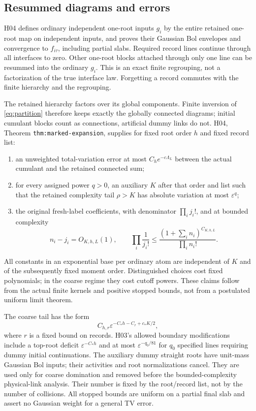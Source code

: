 \documentclass[11pt]{article}
\newcommand{\eps}{\varepsilon}
\theoremstyle{definition}\newtheorem{definition}[theorem]{Definition}
\theoremstyle{remark}\newtheorem{remark}[theorem]{Remark}
\numberwithin{equation}{section}
\begin{document}
\subsection{Resummed diagrams and errors}\label{subsec:expansion}
H04 defines ordinary independent one-root inputs $g_i$ by the entire retained
one-root map on independent inputs, and proves their Gaussian Bol envelopes
and convergence to $f_{i\tau}$, including partial slabs. Required record
lines continue through all interfaces to zero. Other one-root blocks
attached through only one line can be resummed into the ordinary $g_i$.
This is an exact finite regrouping, not a factorization of the true interface
law. Forgetting a record commutes with the finite hierarchy and the
regrouping.

The retained hierarchy factors over its global components. Finite inversion
of \eqref{eq:partition} therefore keeps exactly the globally connected
diagrams; initial cumulant blocks count as connections, artificial dummy
links do not. H04, Theorem \texttt{thm:marked-expansion}, supplies for fixed
root order $h$ and fixed record list:
\begin{enumerate}
\item an unweighted total-variation error at most $C_h e^{-c\Lambda_L}$
 between the actual cumulant and the retained connected sum;
\item for every assigned power $q>0$, an auxiliary $K$ after that order and
 list such that the retained complexity tail $\rho>K$ has absolute variation
 at most $\eps^q$;
\item the original fresh-label coefficients, with denominator
 $\prod_i j_i!$, and at bounded complexity
 \begin{equation}\label{eq:factorials}
 n_i-j_i=O_{K,h,L}(1),\qquad
 \prod_i\frac1{j_i!}\le
     \frac{(1+\sum_i n_i)^{C_{K,h,L}}}{\prod_i n_i!}.
 \end{equation}
\end{enumerate}
All constants in an exponential base per ordinary atom are independent of
$K$ and of the subsequently fixed moment order. Distinguished choices cost
fixed polynomials; in the coarse regime they cost cutoff powers. These
claims follow from the actual finite kernels and positive stopped bounds,
not from a postulated uniform limit theorem.

The coarse tail has the form
\begin{equation}\label{eq:coarse}
 C_{h,r}\eps^{-C_*h-C_r+c_*K/2},
\end{equation}
where $r$ is a fixed bound on records. H03's allowed boundary modifications
include a top-root deficit $\eps^{-C_*h}$ and at most
$\eps^{-q_0/81}$ for $q_0$ specified lines requiring dummy initial
continuations. The auxiliary dummy straight roots have unit-mass Gaussian
Bol inputs; their activities and root normalizations cancel. They are used
only for coarse domination and removed before the bounded-complexity
physical-link analysis. Their number is fixed by the root/record list,
not by the number of collisions. All stopped bounds are uniform on a
partial final slab and assert no Gaussian weight for a general TV error.
\end{document}
